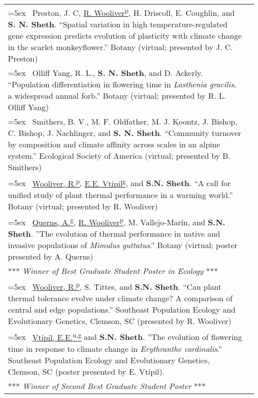 \documentclass[11pt,english]{article}\usepackage[]{graphicx}\usepackage[]{color}
\providecommand{\tabularnewline}{\\}
\begin{document}
\renewcommand{\arraystretch}{1.2}
\begin{tabularx}{\textwidth}{@{}>{\raggedright}p{5.25in} >{\raggedleft}X@{}}

\hangindent=5ex \ Preston, J. C, \underline{R. Wooliver\textsuperscript{p}}, H. Driscoll, E. Coughlin, and \textbf{S. N. Sheth}. ``Spatial variation in high temperature-regulated gene expression predicts evolution of plasticity with climate change in the scarlet monkeyflower.'' Botany (virtual; presented by J. C. Preston) & 2021 \tabularnewline

\hangindent=5ex \ Olliff Yang, R. L., \textbf{S. N. Sheth}, and D. Ackerly. ``Population differentiation in flowering time in \emph{Lasthenia gracilis}, a widespread annual forb.'' Botany (virtual; presented by R. L. Olliff Yang) & 2021 \tabularnewline

\hangindent=5ex \ Smithers, B. V., M. F. Oldfather, M. J. Koontz, J. Bishop, C. Bishop, J. Nachlinger, and \textbf{S. N. Sheth}. ``Community turnover by composition and climate affinity across scales in an alpine system.'' Ecological Society of America (virtual; presented by B. Smithers) & 2020 \tabularnewline

\hangindent=5ex \ \underline{Wooliver, R.\textsuperscript{p}}, \underline{E.E. Vtipil\textsuperscript{g}}, and \textbf{S.N. Sheth}. ``A call for unified study of plant thermal performance in a warming world.'' Botany (virtual; presented by R. Wooliver) & 2020 \tabularnewline

\hangindent=5ex \ \underline{Querns, A.\textsuperscript{g}}, \underline{R. Wooliver\textsuperscript{p}}, M. Vallejo-Mar\'in, and \textbf{S.N. Sheth}. ''The evolution of thermal performance in native and invasive populations of \emph{Mimulus guttatus}.'' Botany (virtual; poster presented by A. Querns) & 2020 \tabularnewline
\hspace{7mm} *** \emph{Winner of Best Graduate Student Poster in Ecology} *** \tabularnewline

\hangindent=5ex \ \underline{Wooliver, R.\textsuperscript{p}}, S. Tittes, and \textbf{S.N. Sheth}. ``Can plant thermal tolerance evolve under climate change? A comparison of central and edge populations.'' Southeast Population Ecology and Evolutionary Genetics, Clemson, SC (presented by R. Wooliver) & 2019 \tabularnewline

\hangindent=5ex \ \underline{Vtipil, E.E.\textsuperscript{u,g}} and \textbf{S.N. Sheth}. ''The evolution of flowering time in response to climate change in \emph{Erythranthe cardinalis}.'' Southeast Population Ecology and Evolutionary Genetics, Clemson, SC (poster presented by E. Vtipil). & 2019 \tabularnewline
\hspace{7mm} *** \emph{Winner of Second Best Graduate Student Poster} *** \tabularnewline


\end{tabularx}
\end{document}
